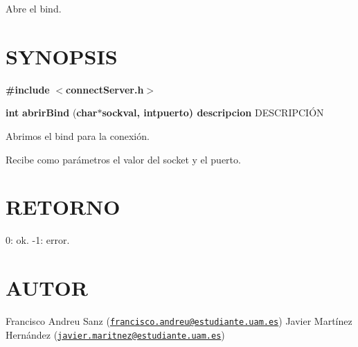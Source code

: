 Abre el bind.\hypertarget{unknown_case_SYNOPSIS}{}\section{S\-Y\-N\-O\-P\-S\-I\-S}\label{unknown_case_SYNOPSIS}
{\bfseries \#include} {\bfseries $<$connect\-Server.\-h$>$} 

{\bfseries int} {\bfseries abrir\-Bind} {\bfseries }({\bfseries char{\bfseries $\ast${\bfseries sockval{\bfseries },} {\bfseries int{\bfseries puerto{\bfseries })}  } } descripcion} D\-E\-S\-C\-R\-I\-P\-C\-IÓ\-N

Abrimos el bind para la conexión.

Recibe como parámetros el valor del socket y el puerto.\hypertarget{unknown_case_retorno}{}\section{R\-E\-T\-O\-R\-N\-O}\label{unknown_case_retorno}
0\-: ok. -\/1\-: error.\hypertarget{unknown_case_authors}{}\section{A\-U\-T\-O\-R}\label{unknown_case_authors}
Francisco Andreu Sanz (\href{mailto:francisco.andreu@estudiante.uam.es}{\tt francisco.\-andreu@estudiante.\-uam.\-es}) Javier Martínez Hernández (\href{mailto:javier.maritnez@estudiante.uam.es}{\tt javier.\-maritnez@estudiante.\-uam.\-es}) 